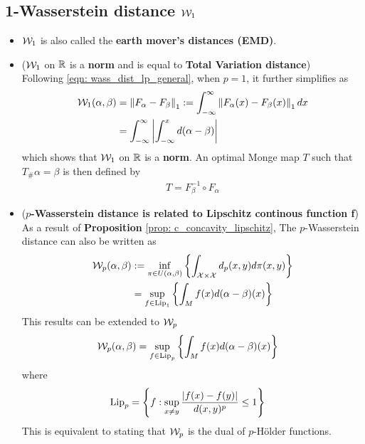 \documentclass[11pt]{article}
\begin{document}
\subsection{1-Wasserstein distance ${\mathcal W}_1$}
\begin{itemize}
\item ${\mathcal W}_1$ is also called the \textbf{earth mover’s distances (EMD)}.

\item (${\mathcal W}_1$ on ${\mathbb R}$ is a \textbf{norm} and is equal to \textbf{Total Variation distance})\\

Following \eqref{eqn: wass_dist_lp_general}, when $p=1$, it further simplifies as 
\begin{align}
{\mathcal W}_{1}(\alpha, \beta) &=  \left\|F_{\alpha} - F_{\beta}\right\|_{1} := \int_{-\infty}^{\infty}\left\|F_{\alpha}(x) - F_{\beta}(x)\right\|_{1} dx  \label{eqn: wass_dist_l1_general}\\
&=  \int_{-\infty}^{\infty}\left\lvert \int_{-\infty}^{x}d(\alpha - \beta)  \right\rvert \label{eqn: wass_dist_l1_general_tv0}
\end{align} which shows that ${\mathcal W}_1$ on ${\mathbb R}$ is a \textbf{norm}. An optimal Monge map $T$ such that $T_{\#}\alpha = \beta$ is then defined by
\begin{align}
T = F_{\beta}^{-1} \circ  F_{\alpha}    \label{eqn: wass_dist_l1_general_optimal_map}
\end{align}

\item (\textbf{$p$-Wasserstein distance is related to Lipschitz continous function f})\\
As a result of \textbf{Proposition} \ref{prop: c_concavity_lipschitz}, The $p$-Wasserstein distance can also be written as 
\begin{align}
{\mathcal W}_{p}(\alpha, \beta) &:= \inf_{\pi \in U(\alpha, \beta)}\left\{\int_{{\mathcal X} \times {\mathcal X}}d_{p}(x,y) d\pi(x, y)\right\} \nonumber\\
&= \sup_{f \in \text{Lip}_1}\left\{\int_{M} f(x) d(\alpha - \beta)(x) \right\}  \label{eqn: wass_dist_c_transform_lip1}
\end{align} This results can be extended to ${\mathcal W}_{p}$
\begin{align}
{\mathcal W}_{p}(\alpha, \beta) &= \sup_{f \in \text{Lip}_p}\left\{\int_{M} f(x) d(\alpha - \beta)(x) \right\}  \label{eqn: wass_dist_p_lip}
\end{align} where 
\begin{align*}
 \text{Lip}_p &= \left\{f: \sup_{x\neq y} \frac{\left\lvert f(x) - f(y) \right\rvert}{d(x, y)^{p}} \le 1\right\}
\end{align*} This is equivalent to stating that ${\mathcal W}_{p}$ is the dual of $p$-H\"older functions. 


\end{itemize}
\end{document}
